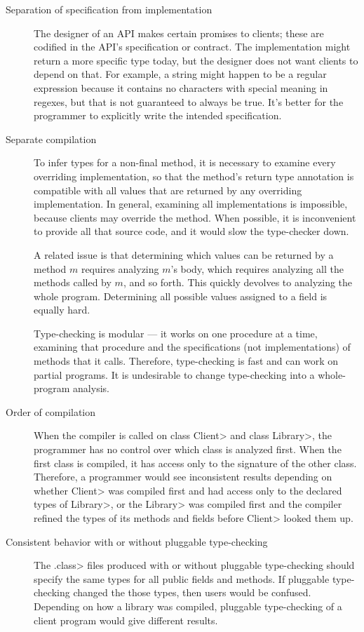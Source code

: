 \begin{description}
\item[Separation of specification from implementation]
  The designer of an API makes certain promises to clients; these are
  codified in the API's specification or contract.  The implementation
  might return a more specific type today, but the designer does not want
  clients to depend on that.  For example, a string might happen to be a
  regular expression because it contains no characters with special meaning
  in regexes, but that is not guaranteed to always be true.  It's better
  for the programmer to explicitly write the intended specification.

\item[Separate compilation]
  To infer types for a non-final method, it is necessary to examine every
  overriding implementation, so that the method's return type annotation is
  compatible with all values that are returned by any overriding
  implementation.  In general, examining all implementations is impossible,
  because clients may override the method.  When possible, it is
  inconvenient to provide all that source code, and it would slow the
  type-checker down.

  A related issue is that determining which values can be returned by a
  method $m$ requires analyzing $m$'s body, which requires analyzing
  all the methods called by $m$, and so forth.  This quickly devolves to
  analyzing the whole program.
  Determining all possible values assigned to a field is equally hard.

  Type-checking is modular --- it works on one procedure at a time,
  examining that procedure and the specifications (not implementations) of
  methods that it calls.  Therefore, type-checking is fast and can work on
  partial programs.  It is undesirable to change type-checking into a
  whole-program analysis.

\item[Order of compilation]
  When the compiler is called on class \<Client> and class \<Library>, the
  programmer has no control over which class is analyzed first.  When the
  first class is compiled, it has access only to the signature of the other
  class.  Therefore, a programmer would see inconsistent results depending
  on whether \<Client> was compiled first and had access only to the
  declared types of \<Library>, or the \<Library> was compiled first and
  the compiler refined the types of its methods and fields before \<Client>
  looked them up.

\item[Consistent behavior with or without pluggable type-checking]
  The \<.class> files produced with or without pluggable type-checking
  should specify the same types for all public fields and methods.  If
  pluggable type-checking changed the those types, then users would be
  confused.  Depending on how a library was compiled, pluggable
  type-checking of a client program would give different results.

\end{description}

